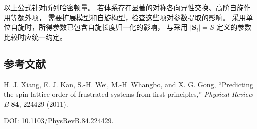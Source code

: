 \documentclass[openany]{book}
\theoremstyle{mydefinition}
\theoremstyle{myplain}
\begin{document}
以上公式针对所列哈密顿量。
若体系存在显著的对称各向异性交换、高阶自旋作用等额外项，
需要扩展模型和自旋构型，检查这些项对参数提取的影响。
采用单位自旋时，所得参数已包含自旋长度归一化的影响，
与采用 \(|\mathbf S_i|=S\) 定义的参数比较时应统一约定。

\vspace{0.5cm}

\subsection*{参考文献}

H. J. Xiang, E. J. Kan, S.-H. Wei, M.-H. Whangbo, and X. G. Gong,
``Predicting the spin-lattice order of frustrated systems from first principles,''
\textit{Physical Review B} \textbf{84}, 224429 (2011).
\par\noindent
\href{https://doi.org/10.1103/PhysRevB.84.224429}
{DOI: 10.1103/PhysRevB.84.224429.}
\end{document}
